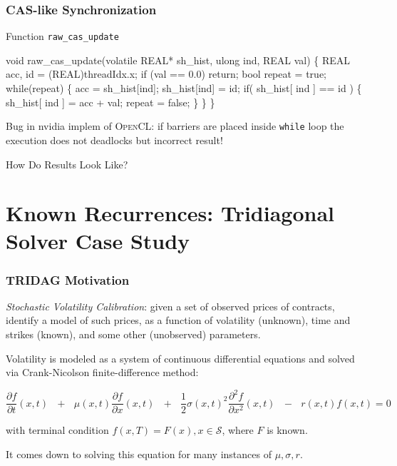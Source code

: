 \documentclass{beamer}
\renewcommand{\emph}[1]{\textcolor{structure}{#1}}
\newcommand{\emp}[1]{\textcolor{DikuRed}{ #1}}
\begin{document}
\begin{frame}[fragile,t]
  \frametitle{ CAS-like Synchronization }

\begin{block}{ Function {\tt raw\_cas\_update} }
\begin{colorcode}[fontsize=\scriptsize]
void raw_cas_update(volatile REAL* sh_hist, ulong ind, REAL val) \{
    REAL acc, id  = (REAL)threadIdx.x;
    if (val == 0.0) return;
    bool repeat = true;
    while(repeat) \{
        acc = sh_hist[ind];
        \emp{sh_hist[ind] = id;} 
        \emp{if( sh_hist[ ind ] == id )} \{
            \emph{sh_hist[ ind ] = acc + val;}
            repeat = false;
        \}
    \}
\}
\end{colorcode}
\end{block} 

\bigskip

Bug in {\sc nvidia} implem of \textsc{OpenCL}: 
if barriers are placed inside {\tt while} loop the
execution does not deadlocks but incorrect result!\bigskip

\alert{How Do Results Look Like?}

\end{frame}


\section{Known Recurrences: Tridiagonal Solver Case Study}
\begin{frame}[fragile]
	\tableofcontents[currentsection]
\end{frame}

\begin{frame}[fragile,t]
  \frametitle{TRIDAG Motivation}

\emp{\em Stochastic Volatility Calibration}: given a set of observed prices
of contracts, identify a model of such prices, as a function of volatility
(unknown), time and strikes (known), and some other (unobserved) parameters.
\bigskip 

Volatility is modeled as a system of continuous differential
equations and solved via Crank-Nicolson finite-difference method:

\begin{equation}
\frac{\partial f}{\partial t}(x,t)\mbox{ }+\mbox{ }\mu(x,t)\frac{\partial f}{\partial x}(x,t)\mbox{ }+\mbox{ }
\frac{1}{2}\sigma(x,t)^{2}\frac{\partial^{2} f}{\partial x^{2}}(x,t)\mbox{ }-\mbox{ }
r(x,t)f(x,t) = 0
\end{equation}

\smallskip

with terminal condition $f(x, T) = F(x), x \in \mathcal{S}$, where $F$ is known.

\bigskip

\emp{It comes down to solving this equation for many instances of $\mu, \sigma, r$.}

\end{frame}
\end{document}
